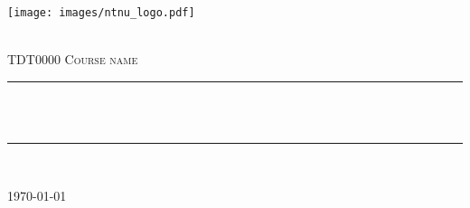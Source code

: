 \begin{titlepage}
\texttt{[image: images/ntnu\_logo.pdf]}\\[1cm]   
\begin{center}

~\\[1.5cm]

\textsc{\Large TDT0000 Course name}\\[1cm]


\hrule ~\\[0.4cm]
{\huge \bfseries \mytitle}\\[1cm]		%
\hrule ~\\[1cm]

\begin{minipage}{0.4\textwidth}
    \centering
	\large
	\myauthor
\end{minipage}

\vfill

{\large \today} \\ \mbox{}\\
\end{center}
\end{titlepage}
